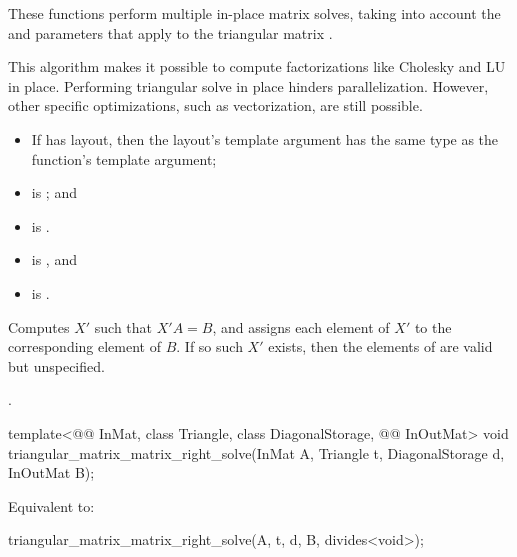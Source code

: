 \begin{itemdescr}
\pnum
These functions perform multiple in-place matrix solves,
taking into account the  and  parameters
that apply to the triangular matrix .
\begin{note}
This algorithm makes it possible
to compute factorizations like Cholesky and LU in place.
Performing triangular solve in place hinders parallelization.
However, other  specific optimizations,
such as vectorization, are still possible.
\end{note}

\pnum
\mandates
\begin{itemize}
\item
If  has  layout,
then the layout's  template argument has
the same type as the function's  template argument;
\item
{}
is ; and
\item
{} is .
\end{itemize}

\pnum
\expects
\begin{itemize}
\item
{} is , and
\item
{} is .
\end{itemize}

\pnum
\effects
Computes $X'$ such that $X'A = B$,
and assigns each element of $X'$ to the corresponding element of $B$.
If so such $X'$ exists,
then the elements of  are valid but unspecified.

\pnum
\complexity
{}.
\end{itemdescr}

\begin{itemdecl}
template<@@ InMat, class Triangle, class DiagonalStorage, @@ InOutMat>
  void triangular_matrix_matrix_right_solve(InMat A, Triangle t, DiagonalStorage d, InOutMat B);
\end{itemdecl}

\begin{itemdescr}
\pnum
\effects
Equivalent to:
\begin{codeblock}
triangular_matrix_matrix_right_solve(A, t, d, B, divides<void>{});
\end{codeblock}
\end{itemdescr}

